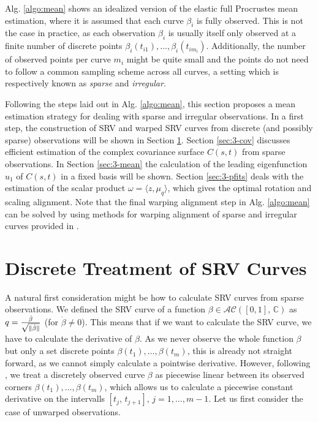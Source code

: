 \label{sec:3}
Alg. \ref{algo:mean} shows an idealized version of the elastic full Procrustes mean estimation, where it is assumed that each curve $\beta_i$ is fully observed.
This is not the case in practice, as each observation $\beta_i$ is usually itself only observed at a finite number of discrete points $\beta_i(t_{i1}), \dots, \beta_i(t_{im_i})$.
Additionally, the number of observed points per curve $m_i$ might be quite small and the points do not need to follow a common sampling scheme across all curves, a setting which is respectively known as \emph{sparse} and \emph{irregular}.

Following the steps laid out in Alg. \ref{algo:mean}, this section proposes a mean estimation strategy for dealing with sparse and irregular observations.
In a first step, the construction of SRV and warped SRV curves from discrete (and possibly sparse) observations will be shown in Section \ref{sec:3-discrete}.
Section \ref{sec:3-cov} discusses efficient estimation of the complex covariance surface $C(s,t)$ from sparse observations.
In Section \ref{sec:3-mean} the calculation of the leading eigenfunction $u_1$ of $C(s,t)$ in a fixed basis will be shown.
Section \ref{sec:3-pfits} deals with the estimation of the scalar product $\omega = \langle z, \mu_q \rangle$, which gives the optimal rotation and scaling alignment.
Note that the final warping alignment step in Alg. \ref{algo:mean} can be solved by using methods for warping alignment of sparse and irregular curves provided in \cite{Steyer2021}.


\section{Discrete Treatment of SRV Curves}
\label{sec:3-discrete}
A natural first consideration might be how to calculate SRV curves from sparse observations.
We defined the SRV curve of a function $\beta \in \mathcal{AC}([0,1],\,\mathbb{C})$ as $q = \frac{\dot\beta}{\sqrt{\lVert\dot\beta\rVert}}$ (for $\dot\beta \neq 0$).
This means that if we want to calculate the SRV curve, we have to calculate the derivative of $\beta$.
As we never observe the whole function $\beta$ but only a set discrete points $\beta(t_1),\dots,\beta(t_m)$, this is already not straight forward, as we cannot simply calculate a pointwise derivative.
However, following \cite{Steyer2021}, we treat a discretely observed curve $\beta$ as piecewise linear between its observed corners $\beta(t_1),\dots,\beta(t_m)$, which allows us to calculate a piecewise constant derivative on the intervalls $[t_j,\,t_{j+1}]$, $j=1,\dots,m-1$.
Let us first consider the case of unwarped observations.

